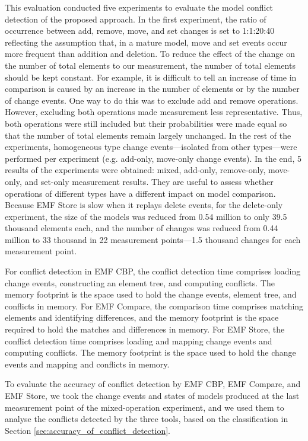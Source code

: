 This evaluation conducted five experiments to evaluate the model conflict detection of the proposed approach. In the first experiment, the ratio of occurrence between \textsf{add}, \textsf{remove}, \textsf{move}, and \textsf{set} changes is set to 1:1:20:40 reflecting the assumption that, in a mature model, \textsf{move} and \textsf{set} events occur more frequent than addition and deletion. To reduce the effect of the change on the number of total elements to our measurement, the number of total elements should be kept constant. For example, it is difficult to tell an increase of time in comparison is caused by an increase in the number of elements or by the number of change events. One way to do this was to exclude \textsf{add} and \textsf{remove} operations. However, excluding both operations made measurement less representative. Thus, both operations were still included but their probabilities were made equal so that the number of total elements remain largely unchanged. In the rest of the experiments,
homogeneous type change events—isolated from other types—were performed per experiment (e.g. add-only, move-only change events). In the end, 5 results of the experiments were obtained: mixed, add-only, remove-only, move-only, and set-only measurement results. They are useful to assess whether operations of different types have a different impact on model comparison. 
Because EMF Store is slow when it replays \textsf{delete} events, for the delete-only experiment, the size of the models was reduced from 0.54 million to only 39.5 thousand elements each, and the number of changes was reduced from 0.44 million to 33 thousand in 22 measurement points—1.5 thousand changes for each measurement point.

For conflict detection in EMF CBP, the conflict detection time comprises loading change events, constructing an element tree, and computing conflicts. The memory footprint is the space used to hold the change events, element tree, and conflicts in memory. For EMF Compare, the comparison time comprises matching elements and identifying differences, and the memory footprint is the space required to hold the matches and differences in memory. For EMF Store, the conflict detection time comprises loading and mapping change events and computing conflicts. The memory footprint is the space used to hold the change events and mapping and conflicts in memory.

To evaluate the accuracy of conflict detection by EMF CBP, EMF Compare, and EMF Store, we took the change events and states of models produced at the last measurement point of the mixed-operation experiment, and we used them to analyse the conflicts detected by the three tools, based on the classification in Section \ref{sec:accuracy_of_conflict_detection}.

